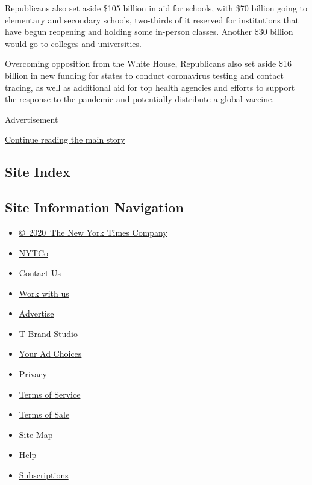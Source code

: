Republicans also set aside \$105 billion in aid for schools, with \$70
billion going to elementary and secondary schools, two-thirds of it
reserved for institutions that have begun reopening and holding some
in-person classes. Another \$30 billion would go to colleges and
universities.

Overcoming opposition from the White House, Republicans also set aside
\$16 billion in new funding for states to conduct coronavirus testing
and contact tracing, as well as additional aid for top health agencies
and efforts to support the response to the pandemic and potentially
distribute a global vaccine.

Advertisement

\protect\hyperlink{after-bottom}{Continue reading the main story}

\hypertarget{site-index}{%
\subsection{Site Index}\label{site-index}}

\hypertarget{site-information-navigation}{%
\subsection{Site Information
Navigation}\label{site-information-navigation}}

\begin{itemize}
\tightlist
\item
  \href{https://help.nytimes.com/hc/en-us/articles/115014792127-Copyright-notice}{©~2020~The
  New York Times Company}
\end{itemize}

\begin{itemize}
\tightlist
\item
  \href{https://www.nytco.com/}{NYTCo}
\item
  \href{https://help.nytimes.com/hc/en-us/articles/115015385887-Contact-Us}{Contact
  Us}
\item
  \href{https://www.nytco.com/careers/}{Work with us}
\item
  \href{https://nytmediakit.com/}{Advertise}
\item
  \href{http://www.tbrandstudio.com/}{T Brand Studio}
\item
  \href{https://www.nytimes.com/privacy/cookie-policy\#how-do-i-manage-trackers}{Your
  Ad Choices}
\item
  \href{https://www.nytimes.com/privacy}{Privacy}
\item
  \href{https://help.nytimes.com/hc/en-us/articles/115014893428-Terms-of-service}{Terms
  of Service}
\item
  \href{https://help.nytimes.com/hc/en-us/articles/115014893968-Terms-of-sale}{Terms
  of Sale}
\item
  \href{https://spiderbites.nytimes.com}{Site Map}
\item
  \href{https://help.nytimes.com/hc/en-us}{Help}
\item
  \href{https://www.nytimes.com/subscription?campaignId=37WXW}{Subscriptions}
\end{itemize}
